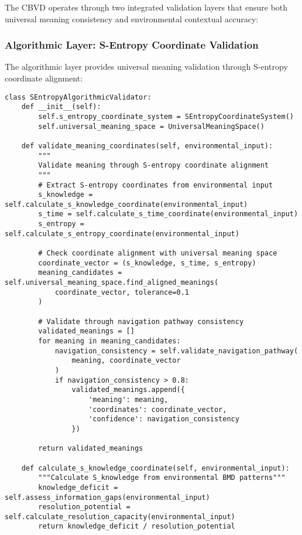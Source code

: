 \documentclass[12pt,a4paper]{article}
\begin{document}
The CBVD operates through two integrated validation layers that ensure both universal meaning consistency and environmental contextual accuracy:

\subsubsection{Algorithmic Layer: S-Entropy Coordinate Validation}

The algorithmic layer provides universal meaning validation through S-entropy coordinate alignment:

\begin{lstlisting}[style=pythonstyle, caption=S-Entropy Algorithmic Validation]
class SEntropyAlgorithmicValidator:
    def __init__(self):
        self.s_entropy_coordinate_system = SEntropyCoordinateSystem()
        self.universal_meaning_space = UniversalMeaningSpace()
        
    def validate_meaning_coordinates(self, environmental_input):
        """
        Validate meaning through S-entropy coordinate alignment
        """
        # Extract S-entropy coordinates from environmental input
        s_knowledge = self.calculate_s_knowledge_coordinate(environmental_input)
        s_time = self.calculate_s_time_coordinate(environmental_input)
        s_entropy = self.calculate_s_entropy_coordinate(environmental_input)
        
        # Check coordinate alignment with universal meaning space
        coordinate_vector = (s_knowledge, s_time, s_entropy)
        meaning_candidates = self.universal_meaning_space.find_aligned_meanings(
            coordinate_vector, tolerance=0.1
        )
        
        # Validate through navigation pathway consistency
        validated_meanings = []
        for meaning in meaning_candidates:
            navigation_consistency = self.validate_navigation_pathway(
                meaning, coordinate_vector
            )
            if navigation_consistency > 0.8:
                validated_meanings.append({
                    'meaning': meaning,
                    'coordinates': coordinate_vector,
                    'confidence': navigation_consistency
                })
        
        return validated_meanings
    
    def calculate_s_knowledge_coordinate(self, environmental_input):
        """Calculate S_knowledge from environmental BMD patterns"""
        knowledge_deficit = self.assess_information_gaps(environmental_input)
        resolution_potential = self.calculate_resolution_capacity(environmental_input)
        return knowledge_deficit / resolution_potential
    

\end{lstlisting}
\end{document}
